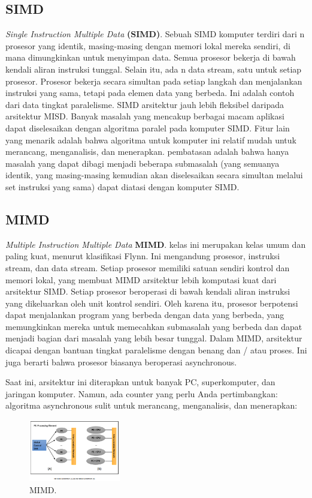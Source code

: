 \subsection{SIMD}
\textit{Single Instruction Multiple Data} \textbf{(SIMD)}. Sebuah SIMD komputer terdiri dari n prosesor yang identik, masing-masing dengan memori lokal mereka sendiri, di mana dimungkinkan untuk menyimpan data. Semua prosesor bekerja di bawah kendali aliran instruksi tunggal. Selain itu, ada n data stream, satu untuk setiap prosesor. Prosesor bekerja secara simultan pada setiap langkah dan menjalankan instruksi yang sama, tetapi pada elemen data yang berbeda. Ini adalah contoh dari data tingkat paralelisme.
SIMD arsitektur jauh lebih fleksibel daripada arsitektur MISD. Banyak masalah yang mencakup berbagai macam aplikasi dapat diselesaikan dengan algoritma paralel pada komputer SIMD. Fitur lain yang menarik adalah bahwa algoritma untuk komputer ini relatif mudah untuk merancang, menganalisis, dan menerapkan. pembatasan adalah bahwa hanya masalah yang dapat dibagi menjadi beberapa submasalah (yang semuanya identik, yang masing-masing kemudian akan diselesaikan secara simultan melalui set instruksi yang sama) dapat diatasi dengan komputer SIMD.
\subsection{MIMD}
\textit{Multiple Instruction Multiple Data} \textbf{MIMD}. kelas ini merupakan kelas umum dan paling kuat, menurut klasifikasi Flynn. Ini mengandung prosesor, instruksi stream, dan data stream. Setiap prosesor memiliki satuan sendiri kontrol dan memori lokal, yang membuat MIMD arsitektur lebih komputasi kuat dari arsitektur SIMD.
Setiap prosesor beroperasi di bawah kendali aliran instruksi yang dikeluarkan oleh unit kontrol sendiri. Oleh karena itu, prosesor berpotensi dapat menjalankan program yang berbeda dengan data yang berbeda, yang memungkinkan mereka untuk memecahkan submasalah yang berbeda dan dapat menjadi bagian dari masalah yang lebih besar tunggal. Dalam MIMD, arsitektur dicapai dengan bantuan tingkat paralelisme dengan benang dan / atau proses. Ini juga berarti bahwa prosesor biasanya beroperasi asynchronous.

Saat ini, arsitektur ini diterapkan untuk banyak PC, superkomputer, dan jaringan komputer. Namun, ada counter yang perlu Anda pertimbangkan: algoritma asynchronous sulit untuk merancang, menganalisis, dan menerapkan:

\begin{figure}[H]
	\includegraphics[width=4cm]{figures/kelompok2/chapter1/5.png}
	\centering
	\caption{MIMD.}
\end{figure}

